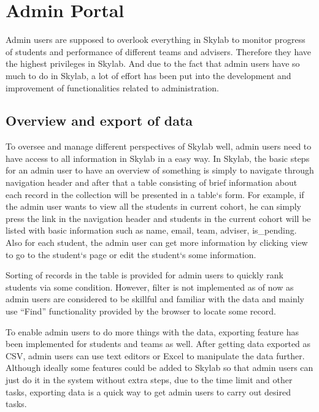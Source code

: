 \chapter{Admin Portal} \label{adminportal}

Admin users are supposed to overlook everything in Skylab to monitor progress of students and performance of different teams and advisers. Therefore they have the highest privileges in Skylab. And due to the fact that admin users have so much to do in Skylab, a lot of effort has been put into the development and improvement of functionalities related to administration.

\section{Overview and export of data} \label{adminoverview}

To oversee and manage different perspectives of Skylab well, admin users need to have access to all information in Skylab in a easy way. In Skylab, the basic steps for an admin user to have an overview of something is simply to navigate through navigation header and after that a table consisting of brief information about each record in the collection will be presented in a table`s form. For example, if the admin user wants to view all the students in current cohort, he can simply press the link in the navigation header and students in the current cohort will be listed with basic information such as name, email, team, adviser, is\_pending. Also for each student, the admin user can get more information by clicking view to go to the student`s page or edit the student`s some information.

Sorting of records in the table is provided for admin users to quickly rank students via some condition. However, filter is not implemented as of now as admin users are considered to be skillful and familiar with the data and mainly use ``Find'' functionality provided by the browser to locate some record.

To enable admin users to do more things with the data, exporting feature has been implemented for students and teams as well. After getting data exported as CSV, admin users can use text editors or Excel to manipulate the data further. Although ideally some features could be added to Skylab so that admin users can just do it in the system without extra steps, due to the time limit and other tasks, exporting data is a quick way to get admin users to carry out desired tasks.

